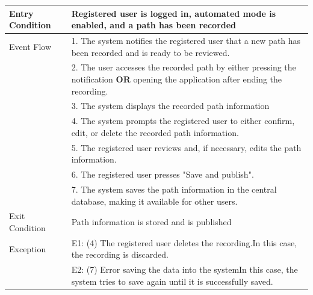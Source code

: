 \begin{enumerate}[label=\textbf{[UC\arabic*]}]
\begin{center}
\begin{tabular}{|p{4cm}|p{11cm}|}
                \hline
                Entry Condition & Registered user is logged in, automated mode is enabled, and a path has been recorded \\
                \hline
                Event Flow & 1. The system notifies the registered user that a new path has been recorded and is ready to be reviewed. \\
                & 2. The user accesses the recorded path by either pressing the notification \textbf{OR} opening the application after ending the recording. \\
                & 3. The system displays the recorded path information \\
                & 4. The system prompts the registered user to either confirm, edit, or delete the recorded path information.\\
                & 5. The registered user reviews and, if necessary, edits the path information. \\
                & 6. The registered user presses "Save and publish". \\
                & 7. The system saves the path information in the central database, making it available for other users. \\
                \hline
                Exit Condition & Path information is stored and is published \\
                \hline
                Exception & E1: (4) The registered user deletes the recording.\newline In this case, the recording is discarded.\\
                & E2: (7) Error saving the data into the system\newline In this case, the system tries to save again until it is successfully saved. \\
                \hline
            \end{tabular}
        \end{center}


\end{enumerate}
